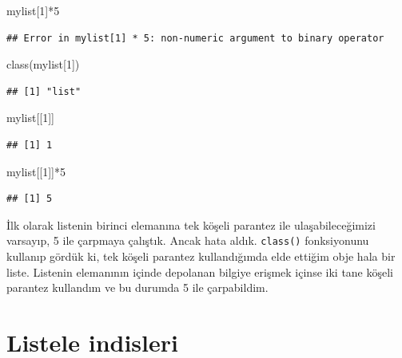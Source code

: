 \documentclass[
]{book}
\newenvironment{Shaded}{\begin{snugshade}}{\end{snugshade}}
\newcommand{\DecValTok}[1]{\textcolor[rgb]{0.00,0.00,0.81}{#1}}
\newcommand{\FunctionTok}[1]{\textcolor[rgb]{0.00,0.00,0.00}{#1}}
\newcommand{\NormalTok}[1]{#1}
\newcommand{\SpecialCharTok}[1]{\textcolor[rgb]{0.00,0.00,0.00}{#1}}
\begin{document}
\begin{Shaded}
\begin{Highlighting}[]
\NormalTok{mylist[}\DecValTok{1}\NormalTok{]}\SpecialCharTok{*}\DecValTok{5}
\end{Highlighting}
\end{Shaded}

\begin{verbatim}
## Error in mylist[1] * 5: non-numeric argument to binary operator
\end{verbatim}

\begin{Shaded}
\begin{Highlighting}[]
\FunctionTok{class}\NormalTok{(mylist[}\DecValTok{1}\NormalTok{])}
\end{Highlighting}
\end{Shaded}

\begin{verbatim}
## [1] "list"
\end{verbatim}

\begin{Shaded}
\begin{Highlighting}[]
\NormalTok{mylist[[}\DecValTok{1}\NormalTok{]]}
\end{Highlighting}
\end{Shaded}

\begin{verbatim}
## [1] 1
\end{verbatim}

\begin{Shaded}
\begin{Highlighting}[]
\NormalTok{mylist[[}\DecValTok{1}\NormalTok{]]}\SpecialCharTok{*}\DecValTok{5}
\end{Highlighting}
\end{Shaded}

\begin{verbatim}
## [1] 5
\end{verbatim}

İlk olarak listenin birinci elemanına tek köşeli parantez ile ulaşabileceğimizi varsayıp, 5 ile çarpmaya çalıştık. Ancak hata aldık. \texttt{class()} fonksiyonunu kullanıp gördük ki, tek köşeli parantez kullandığımda elde ettiğim obje hala bir liste. Listenin elemanının içinde depolanan bilgiye erişmek içinse iki tane köşeli parantez kullandım ve bu durumda 5 ile çarpabildim.

\hypertarget{listele-indisleri}{%
\section{Listele indisleri}\label{listele-indisleri}}
\end{document}
